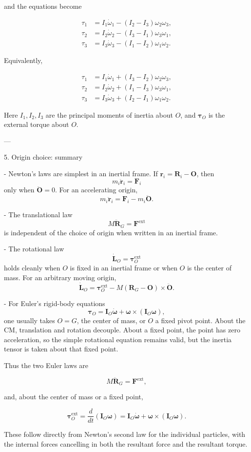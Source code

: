 \documentclass[a4paper,11pt]{article}
\begin{document}
and the equations become

\[
\boxed{
\begin{aligned}
\tau_1 &= I_1\dot\omega_1-(I_2-I_3)\omega_2\omega_3,\\[2mm]
\tau_2 &= I_2\dot\omega_2-(I_3-I_1)\omega_3\omega_1,\\[2mm]
\tau_3 &= I_3\dot\omega_3-(I_1-I_2)\omega_1\omega_2.
\end{aligned}
}
\]

Equivalently,

\[
\begin{aligned}
\tau_1 &= I_1\dot\omega_1+(I_3-I_2)\omega_2\omega_3,\\
\tau_2 &= I_2\dot\omega_2+(I_1-I_3)\omega_3\omega_1,\\
\tau_3 &= I_3\dot\omega_3+(I_2-I_1)\omega_1\omega_2.
\end{aligned}
\]

Here \(I_1,I_2,I_3\) are the principal moments of inertia about \(O\), and \(\boldsymbol\tau_O\) is the external torque about \(O\).

---

5. Origin choice: summary

- Newton’s laws are simplest in an inertial frame. If \(\mathbf r_i=\mathbf R_i-\mathbf O\), then
  \[
  m_i\ddot{\mathbf r}_i=\mathbf F_i
  \]
  only when \(\ddot{\mathbf O}=0\). For an accelerating origin,
  \[
  m_i\ddot{\mathbf r}_i=\mathbf F_i-m_i\ddot{\mathbf O}.
  \]

- The translational law
  \[
  M\ddot{\mathbf R}_G=\mathbf F^{\mathrm{ext}}
  \]
  is independent of the choice of origin when written in an inertial frame.

- The rotational law
  \[
  \dot{\mathbf L}_O=\boldsymbol\tau_O^{\mathrm{ext}}
  \]
  holds cleanly when \(O\) is fixed in an inertial frame or when \(O\) is the center of mass. For an arbitrary moving origin,
  \[
  \dot{\mathbf L}_O
  =
  \boldsymbol\tau_O^{\mathrm{ext}}
  -
  M(\mathbf R_G-\mathbf O)\times\ddot{\mathbf O}.
  \]

- For Euler’s rigid-body equations
  \[
  \boldsymbol\tau_O
  =
  \mathbf I_O\dot{\boldsymbol\omega}
  +
  \boldsymbol\omega\times(\mathbf I_O\boldsymbol\omega),
  \]
  one usually takes \(O=G\), the center of mass, or \(O\) a fixed pivot point. About the CM, translation and rotation decouple. About a fixed point, the point has zero acceleration, so the simple rotational equation remains valid, but the inertia tensor is taken about that fixed point.

Thus the two Euler laws are

\[
\boxed{
M\ddot{\mathbf R}_G=\mathbf F^{\mathrm{ext}},
}
\]

and, about the center of mass or a fixed point,

\[
\boxed{
\boldsymbol\tau_O^{\mathrm{ext}}
=
\frac{d}{dt}\left(\mathbf I_O\boldsymbol\omega\right)
=
\mathbf I_O\dot{\boldsymbol\omega}
+
\boldsymbol\omega\times(\mathbf I_O\boldsymbol\omega).
}
\]

These follow directly from Newton’s second law for the individual particles, with the internal forces cancelling in both the resultant force and the resultant torque.
\end{document}
